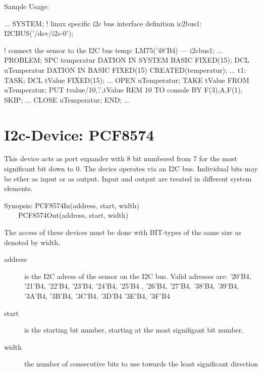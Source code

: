 Sample Usage:
\begin{PEARLCode}
...
SYSTEM;
   ! linux specific i2c bus interface definition
   ic2bus1: I2CBUS('/dev/i2c-0');

   ! connect the sensor to the I2C bus
   temp: LM75('48'B4) --- i2cbus1;
...
PROBLEM;
   SPC temperatur DATION IN SYSTEM BASIC FIXED(15);
   DCL uTemperatur DATION IN BASIC FIXED(15) CREATED(temperatur);
...
t1: TASK;
   DCL tValue FIXED(15);
...
   OPEN uTemperatur;
   TAKE tValue FROM uTemperatur;
   PUT tvalue/10,'.',tValue REM 10 TO console BY F(3),A,F(1), SKIP;
...
   CLOSE uTemperatur;
END;
...
\end{PEARLCode}

\section{I2c-Device: PCF8574}
This device acts as port expander with 8 bit numbered from 7
for the most significant bit down to 0.
The decice operates via an I2C bus. 
Individual bits may be ether as input or as output.
Input and output are treated in different system elements.

Synopsis: PCF8574In(address, start, width) \\
\ \ \ \ PCF8574Out(address, start, width)

The access of these devices must be done with BIT-types of the same size
as denoted by width.

\begin{description}
\item[address] is the I2C adress of the sensor on the I2C bus.
   Valid adresses are: '20'B4, '21'B4, '22'B4, '23'B4,
            '24'B4, '25'B4 , '26'B4, '27'B4,
            '38'B4, '39'B4, '3A'B4, '3B'B4, '3C'B4, '3D'B4 '3E'B4, '3F'B4
\item[start] is the starting bit number, starting at the most signifigant bit 
    number. 
\item[width] the number of consecutive bits to use
      towards the least significant direction
\end{description}

